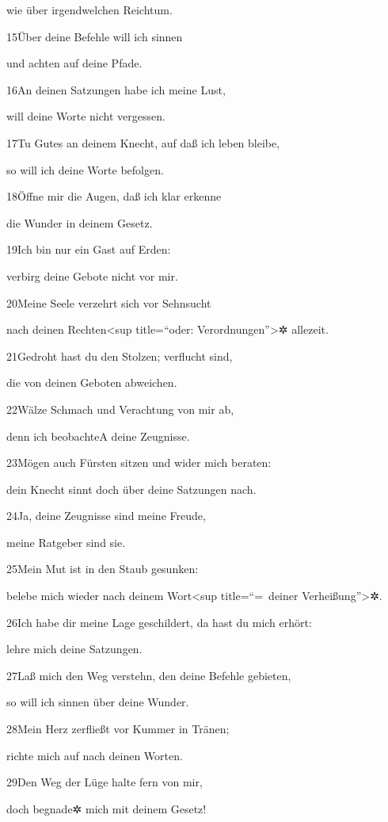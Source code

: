wie über irgendwelchen Reichtum.

15Über deine Befehle will ich sinnen

und achten auf deine Pfade.

16An deinen Satzungen habe ich meine Lust,

will deine Worte nicht vergessen.

17Tu Gutes an deinem Knecht, auf daß ich leben bleibe,

so will ich deine Worte befolgen.

18Öffne mir die Augen, daß ich klar erkenne

die Wunder in deinem Gesetz.

19Ich bin nur ein Gast auf Erden:

verbirg deine Gebote nicht vor mir.

20Meine Seele verzehrt sich vor Sehnsucht

nach deinen Rechten\textless sup title=``oder:
Verordnungen''\textgreater✲ allezeit.

21Gedroht hast du den Stolzen; verflucht sind,

die von deinen Geboten abweichen.

22Wälze Schmach und Verachtung von mir ab,

denn ich beobachte{A} deine Zeugnisse.

23Mögen auch Fürsten sitzen und wider mich beraten:

dein Knecht sinnt doch über deine Satzungen nach.

24Ja, deine Zeugnisse sind meine Freude,

meine Ratgeber sind sie.

25Mein Mut ist in den Staub gesunken:

belebe mich wieder nach deinem Wort\textless sup title=``=~deiner
Verheißung''\textgreater✲.

26Ich habe dir meine Lage geschildert, da hast du mich erhört:

lehre mich deine Satzungen.

27Laß mich den Weg verstehn, den deine Befehle gebieten,

so will ich sinnen über deine Wunder.

28Mein Herz zerfließt vor Kummer in Tränen;

richte mich auf nach deinen Worten.

29Den Weg der Lüge halte fern von mir,

doch begnade✲ mich mit deinem Gesetz!

